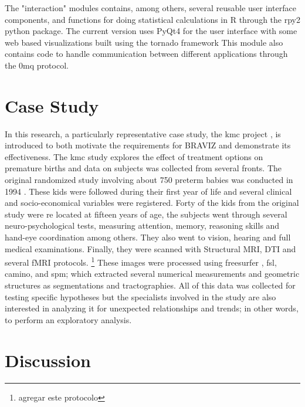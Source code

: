 \documentclass[utf8]{frontiersSCNS} %
\begin{document}
The "interaction" modules contains, among others, several reusable user interface components, and functions for doing statistical calculations in R\citep{team_r:_2012} through the rpy2 \citep{gautier_rpy2:_2008} python package. The current version uses PyQt4 for the user interface with some web based visualizations built using the tornado\citep{server_source_2008} framework  This module also contains code to handle communication between different applications through the 0mq protocol\citep{hintjens_zeromq:_2013}.

\section{Case Study}

In this research, a particularly representative case study, the kmc project \cite{schneider_cerebral_2012}, is introduced to both motivate the requirements for BRAVIZ and demonstrate its effectiveness. The kmc study explores the effect of treatment options on premature births and data on subjects was collected from several fronts. The original randomized study involving about 750 preterm babies was conducted in 1994 \citep{charpak_kangaroo_1997}. These kids were followed during their first year \citep{charpak_randomized_2001, tessier_kangaroo_2009} of life and several clinical and socio-economical variables were registered. Forty of the kids from the original study were re located at fifteen years of age, the  subjects went through several neuro-psychological tests, measuring attention, memory, reasoning skills and hand-eye coordination among others. They also went to vision, hearing and full medical examinations. Finally, they were scanned with Structural MRI, DTI and several fMRI protocols. \footnote{agregar este protocolo} These images were processed using freesurfer \citep{fischl_freesurfer_2012}, fsl\citep{jenkinson_fsl_2012}, camino\citep{cook_camino:_2006}, and spm\citep{friston_statistical_2006}; which extracted several numerical measurements and geometric structures as segmentations and tractographies. All of this data was collected for testing specific hypotheses but the specialists involved in the study are also interested in analyzing it for unexpected relationships and trends; in other words, to perform an exploratory analysis\citep{tukey_we_1980}.

\section{Discussion}
\end{document}
